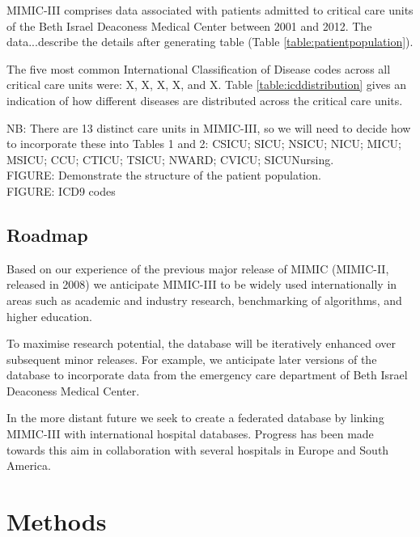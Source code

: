 \documentclass[english]{article}
\begin{document}
MIMIC-III comprises data associated with patients admitted to critical care units of the Beth Israel Deaconess Medical Center between 2001 and 2012. The data...describe the details after generating table (Table \ref{table:patientpopulation}).

The five most common International Classification of Disease codes across all critical care units were: X, X, X, X, and X. Table \ref{table:icddistribution} gives an indication of how different diseases are distributed across the critical care units. 

NB: There are 13 distinct care units in MIMIC-III, so we will need to decide how to incorporate these into Tables 1 and 2: CSICU; SICU; NSICU; NICU; MICU; MSICU; CCU; CTICU; TSICU; NWARD; CVICU; SICUNursing. \\

FIGURE: Demonstrate the structure of the patient population. \\

FIGURE: ICD9 codes \\

\subsection*{Roadmap}

Based on our experience of the previous major release of MIMIC (MIMIC-II, released in 2008) we anticipate MIMIC-III to be widely used internationally in areas such as academic and industry research, benchmarking of algorithms, and higher education.

To maximise research potential, the database will be iteratively enhanced over subsequent minor releases. For example, we anticipate later versions of the database to incorporate data from the emergency care department of Beth Israel Deaconess Medical Center.

In the more distant future we seek to create a federated database by linking MIMIC-III with international hospital databases. Progress has been made towards this aim in collaboration with several hospitals in Europe and South America.

\section*{Methods}
\end{document}
